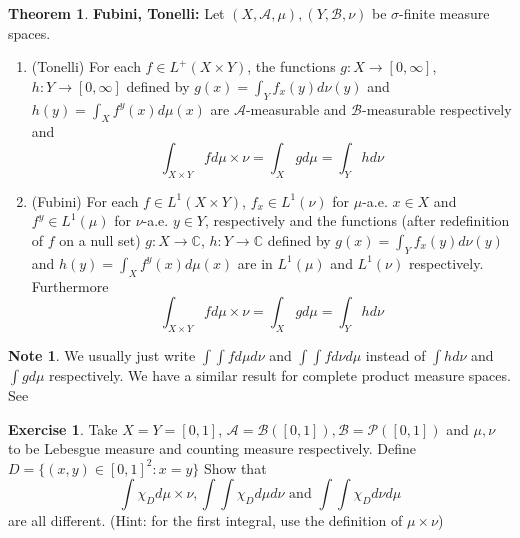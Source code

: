 \documentclass[12pt]{amsart}
\theoremstyle{definition}
\newtheorem{note}[definition]{Note}
\newtheorem{thm}[definition]{Theorem}
\newtheorem{ex}[definition]{Exercise}
\newcommand{\sig}{\sigma}
\newcommand{\C}{\mathbb{C}}
\newcommand{\MA}{\mathcal{A}}
\newcommand{\MB}{\mathcal{B}}
\newcommand{\MP}{\mathcal{P}}
\newcommand{\RG}{[0,\infty]}
\newcommand{\lex}[1]{\label{ex:#1}}
\begin{document}
	\begin{thm}\textbf{Fubini, Tonelli:}
		Let $(X,\MA, \mu), (Y, \MB, \nu)$ be $\sig$-finite measure spaces. 
		
		\begin{enumerate}
			\item (Tonelli) For each $f \in L^+(X \times Y)$, the functions $g:X \rightarrow \RG$, $h:Y \rightarrow \RG$ defined by $g(x) = \int_Y f_x(y)d\nu(y)$ and $h(y) = \int_X f^y(x) d \mu(x)$ are $\MA$-measurable and $\MB$-measurable respectively and $$\int_{X \times Y}f d \mu \times \nu = \int_X g d\mu = \int_Y h d\nu$$
			
			\item (Fubini) For each $f \in L^1(X \times Y)$, $f_x \in L^1(\nu)$ for $\mu$-a.e. $x \in X$ and $f^y \in L^1(\mu)$ for $\nu$-a.e. $y \in Y$, respectively and  the functions (after redefinition of $f$ on a null set) $g:X \rightarrow \C$, $h:Y \rightarrow \C$ defined by $g(x) = \int_Y f_x(y)d\nu(y)$ and $h(y) = \int_X f^y(x) d \mu(x)$ are in $L^1(\mu)$ and $L^1(\nu)$ respectively. Furthermore 
			$$\int_{X \times Y}f d \mu \times \nu = \int_X g d\mu = \int_Y h d\nu$$
		\end{enumerate}
	\end{thm}
	
	\begin{note}
		We usually just write $\int \int f d\mu d\nu$ and $\int \int f d\nu d\mu$ instead of $\int h d\nu$ and $\int g d\mu$ respectively. We have a similar result for complete product measure spaces. See 
	\end{note}
	
	\begin{ex} \lex{00000} 
		Take $X=Y= [0,1]$, $\MA = \MB([0,1]), \MB = \MP([0,1])$ and $\mu,\nu$ to be Lebesgue measure and counting measure respectively. Define $D = \{(x,y) \in [0,1]^2: x=y\}$ Show that $$\int \chi_D d\mu \times \nu, \int \int \chi_D d\mu d \nu \text{ and } \int \int \chi_D d\nu d\mu$$ are all different. (Hint: for the first integral, use the definition of $\mu \times \nu$)
	\end{ex}
	
\end{document}
